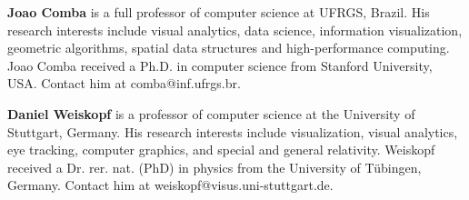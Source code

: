 \documentclass[10pt,journal,compsoc]{IEEEtran}
\begin{document}





\textbf{Joao Comba} is a full professor of computer science at UFRGS, Brazil. His research interests include visual analytics, data science, information visualization, geometric algorithms, spatial data structures and high-performance computing. Joao Comba received a Ph.D. in computer science from Stanford University, USA. Contact him at comba@inf.ufrgs.br.


\textbf{Daniel Weiskopf} is a professor of computer science at the University of Stuttgart, Germany. His research interests include visualization, visual analytics, eye tracking, computer graphics, and special and general relativity. Weiskopf received a Dr. rer. nat. (PhD) in physics from the University of T\"ubingen, Germany. Contact him at weiskopf@visus.uni-stuttgart.de.
\end{document}

